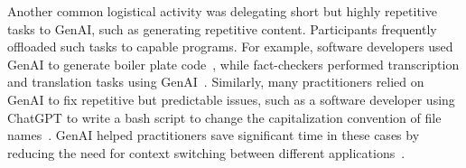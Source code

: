 Another common logistical activity was delegating short but highly repetitive tasks to GenAI, such as generating repetitive content. Participants frequently offloaded such tasks to capable programs. For example, software developers used GenAI to generate boiler plate code~\cite{16}, while fact-checkers performed transcription and translation tasks using GenAI~\cite{1}. Similarly, many practitioners relied on GenAI to fix repetitive but predictable issues, such as a software developer using ChatGPT to write a bash script to change the capitalization convention of file names~\cite{11}. GenAI helped practitioners save significant time in these cases by reducing the need for context switching between different applications~\cite{8}.


